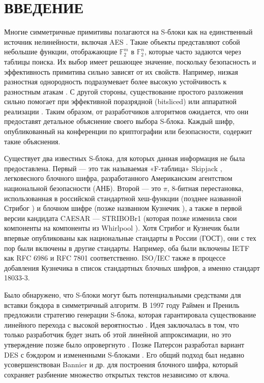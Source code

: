 \section{ВВЕДЕНИЕ}
Многие симметричные примитивы полагаются на S-блоки как на единственный источник нелинейности, включая AES \cite{AES01}. Такие объекты представляют собой небольшие функции, отображающие \(\mathbb{F}_2^m\) в \(\mathbb{F}_2^n\), которые часто задаются через таблицы поиска. Их выбор имеет решающее значение, поскольку безопасность и эффективность примитива сильно зависят от их свойств. Например, низкая разностная однородность \cite{Nyb94} подразумевает более высокую устойчивость к разностным атакам \cite{BS91a, BS91b}. С другой стороны, существование простого разложения сильно помогает при эффективной поразрядной (bitsliced) или аппаратной реализации \cite{LW14, CDL16}. Таким образом, от разработчиков алгоритмов ожидается, что они предоставят детальное объяснение своего выбора S-блока. Каждый шифр, опубликованный на конференции по криптографии или безопасности, содержит такие объяснения.

Существует два известных S-блока, для которых данная информация не была предоставлена. Первый — это так называемая «F-таблица» Skipjack \cite{US98}, легковесного блочного шифра, разработанного Американским агентством национальной безопасности (АНБ). Второй — это \(\pi\), 8-битная перестановка, использованная в российской стандартной хеш-функции (позднее названной Стрибог \cite{Fed12}) и блочном шифре (позже названном Кузнечик \cite{Fed15}), а также в первой версии кандидата CAESAR — STRIBOBr1 \cite{Saa14} (которая позже изменила свои компоненты на компоненты из Whirlpool \cite{SB15}). Хотя Стрибог и Кузнечик были впервые опубликованы как национальные стандарты в России (ГОСТ), они с тех пор были включены в другие стандарты. Например, оба были включены IETF как RFC 6986 \cite{DD13} и RFC 7801 \cite{Dol16} соответственно. ISO/IEC также в процессе добавления Кузнечика в список стандартных блочных шифров, а именно стандарт 18033-3.

Было обнаружено, что S-блоки могут быть потенциальными средствами для вставки бэкдора в симметричный алгоритм. В 1997 году Раймен и Прениль предложили стратегию генерации S-блока, которая гарантировала существование линейного перехода с высокой вероятностью \cite{RP97}. Идея заключалась в том, что только разработчик будет знать об этой линейной аппроксимации, но это утверждение позже было опровергнуто \cite{WBDY98}. Позже Патерсон разработал вариант DES с бэкдором и измененными S-блоками \cite{Pat99}. Его общий подход был недавно усовершенствован Bannier и др. \cite{BBF16} для построения блочного шифра, который сохраняет разбиение множество открытых текстов независимо от ключа.

